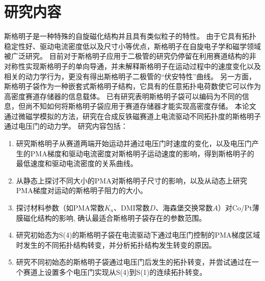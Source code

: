\section{研究内容}
斯格明子是一种特殊的自旋磁化结构并且具有类似粒子的特性。
由于它具有拓扑稳定性好、驱动电流密度低以及尺寸小等优点，斯格明子在自旋电子学和磁学领域被广泛研究。
目前对于斯格明子应用于二极管的研究仍停留在利用赛道结构的非对称性实现斯格明子的单向导通，并未解释斯格明子在运动过程中的速度变化以及相关的动力学行为，更没有得出斯格明子二极管的“伏安特性”曲线。
另一方面，斯格明子袋作为一种嵌套式斯格明子结构，它具有的任意拓扑电荷数使它可以作为高密度赛道存储器的信息载体。
已有研究表明斯格明子袋可以编码为不同的信息，但尚不知如何将斯格明子袋应用于赛道存储器才能实现高密度存储。
本论文通过微磁学模拟的方法，研究在合成反铁磁赛道上电流驱动不同拓扑度的斯格明子通过电压门的动力学。
研究内容包括：
\begin{enumerate}[label=(\arabic*), leftmargin=4ex, labelsep=1.4ex, itemsep=0pt, topsep=1ex,partopsep=1ex,parsep=0pt]
    \item 研究斯格明子从赛道两端开始运动并通过电压门时速度的变化，以及电压门产生的PMA梯度和驱动电流密度对斯格明子运动速度的影响，得到斯格明子的最低速度和驱动电流密度的关系曲线。
    \item 从静态上探讨不同大小的PMA对斯格明子尺寸的影响，以及从动态上研究PMA梯度对运动的斯格明子阻力的大小。
    \item 探讨材料参数（如PMA常数$K_u$、DMI常数$D$、海森堡交换常数$A$）对Co/Pt薄膜磁化结构的影响, 确认最适合斯格明子袋存在的参数范围。
    \item 研究初始态为S(4)的斯格明子袋在电流驱动下通过电压门控制的PMA梯度区域时发生的不同拓扑结构转变，并分析拓扑结构发生转变的原因。
    \item 研究不同初始态的斯格明子袋通过电压门后发生的拓扑转变，并尝试通过在一个赛道上设置多个电压门实现从S(4)到S(1)的连续拓扑转变。
\end{enumerate}
